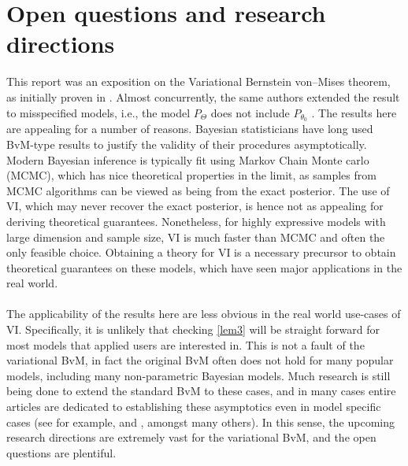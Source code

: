 

\section{Open questions and research directions}

This report was an exposition on the Variational Bernstein von--Mises theorem, as initially proven in \cite{Wang:2019:VBVM}. Almost concurrently, the same authors extended the result to misspecified models, i.e., the model $P_\Theta$ does not include $P_{\theta_0}$ \cite{Wang::mis2019}. The results here are appealing for a number of reasons. Bayesian statisticians have long used BvM-type results to justify the validity of their procedures asymptotically. Modern Bayesian inference is typically fit using Markov Chain Monte carlo (MCMC), which has nice theoretical properties in the limit, as samples from MCMC algorithms can be viewed as being from the exact posterior. The use of VI, which may never recover the exact posterior, is hence not as appealing for deriving theoretical guarantees. Nonetheless, for highly expressive models with large dimension and sample size, VI is much faster than MCMC and often the only feasible choice. Obtaining a theory for VI is a necessary precursor to obtain theoretical guarantees on these models, which have seen major applications in the real world. 

\paragraph{} The applicability of the results here are less obvious in the real world use-cases of VI. Specifically, it is unlikely that checking \ref{lem3} will be straight forward for most models that applied users are interested in. This is not a fault of the variational BvM, in fact the original BvM often does not hold for many popular models, including many non-parametric Bayesian models. Much research is still being done to extend the standard BvM to these cases, and in many cases entire articles are dedicated to establishing these asymptotics even in model specific cases (see for example, \cite{Castillo::2013} and \cite{Castillo::2015}, amongst many others). In this sense, the upcoming research directions are extremely vast for the variational BvM, and the open questions are plentiful.  

